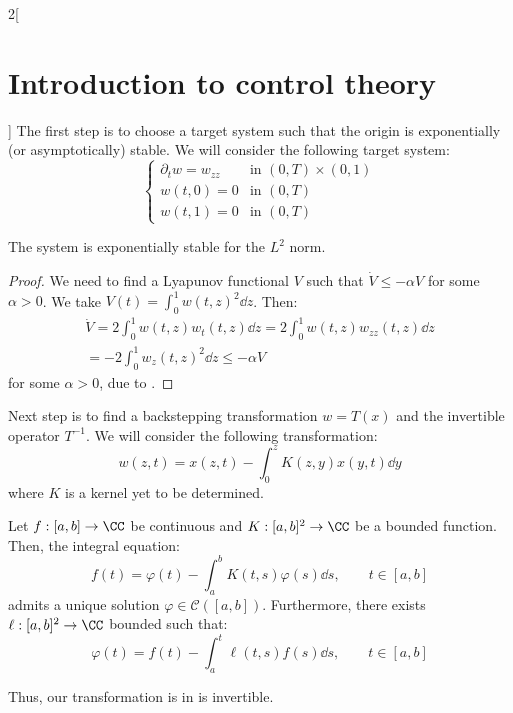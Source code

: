 \documentclass[../../../main_math.tex]{subfiles}
\begin{document}
\begin{multicols}{2}[\section{Introduction to control theory}]
  The first step is to choose a target system such that the origin is exponentially (or asymptotically) stable. We will consider the following target system:
  \begin{equation}\label{ICT:target_system}
    \begin{cases}
      \partial_t w=w_{zz} & \text{in } (0,T)\times (0,1) \\
      w(t,0)=0            & \text{in } (0,T)             \\
      w(t,1)=0            & \text{in } (0,T)
    \end{cases}
  \end{equation}
  \begin{proposition}
    The system  is exponentially stable for the $L^2$ norm.
  \end{proposition}
  \begin{proof}
    We need to find a Lyapunov functional $V$ such that $\dot{V}\leq -\alpha V$ for some $\alpha>0$. We take $V(t)=\int_0^1 w(t,z)^2\dd z$. Then:
    \begin{multline*}
      \dot{V} = 2\int_0^1 w(t,z)w_t(t,z)\dd z=2\int_0^1 w(t,z)w_{zz}(t,z)\dd z \\
      = -2\int_0^1 w_z(t,z)^2\dd z\leq  -\alpha V
    \end{multline*}
    for some $\alpha >0$, due to .
  \end{proof}
  Next step is to find a backstepping transformation $w=T(x)$ and the invertible operator $T^{-1}$. We will consider the following transformation:
  \begin{equation}\label{ICT:backstepping_transformation}
    w(z,t)=x(z,t)-\int_0^z K(z,y) x(y,t)\dd y
  \end{equation}
  where $K$ is a kernel yet to be determined.
  \begin{proposition}
    Let $f:[a,b]\to\CC$ be continuous and $K:[a,b]^2\to \CC$ be a bounded function. Then, the integral equation:
    $$
      f(t) = \varphi(t)-\int_a^b K(t,s)\varphi(s) \dd s,\qquad t\in [a,b]
    $$
    admits a unique solution $\varphi\in \mathcal{C}([a,b])$. Furthermore, there exists $\ell :[a,b]^2\to \CC$ bounded such that:
    $$
      \varphi(t)=f(t)-\int_a^t \ell(t,s)f(s)\dd s, \qquad t\in [a,b]
    $$
  \end{proposition}
  Thus, our transformation is in  is invertible.


\end{multicols}
\end{document}
